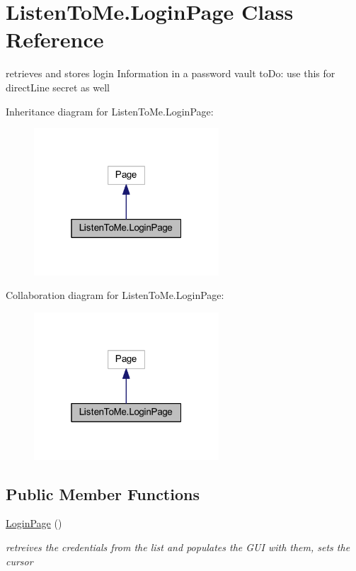 \hypertarget{class_listen_to_me_1_1_login_page}{}\section{Listen\+To\+Me.\+Login\+Page Class Reference}
\label{class_listen_to_me_1_1_login_page}


retrieves and stores login Information in a password vault to\+Do\+: use this for direct\+Line secret as well  




Inheritance diagram for Listen\+To\+Me.\+Login\+Page\+:
\nopagebreak
\begin{figure}[H]
\begin{center}
\leavevmode
\includegraphics[width=196pt]{class_listen_to_me_1_1_login_page__inherit__graph}
\end{center}
\end{figure}


Collaboration diagram for Listen\+To\+Me.\+Login\+Page\+:
\nopagebreak
\begin{figure}[H]
\begin{center}
\leavevmode
\includegraphics[width=196pt]{class_listen_to_me_1_1_login_page__coll__graph}
\end{center}
\end{figure}
\subsection*{Public Member Functions}
\begin{DoxyCompactItemize}
\item 
\hyperlink{class_listen_to_me_1_1_login_page_afcefc5f9f4f5cee5d9f5e15493e4058b}{Login\+Page} ()
\begin{DoxyCompactList}\small\item\em retreives the credentials from the list and populates the G\+UI with them, sets the cursor \end{DoxyCompactList}\end{DoxyCompactItemize}

